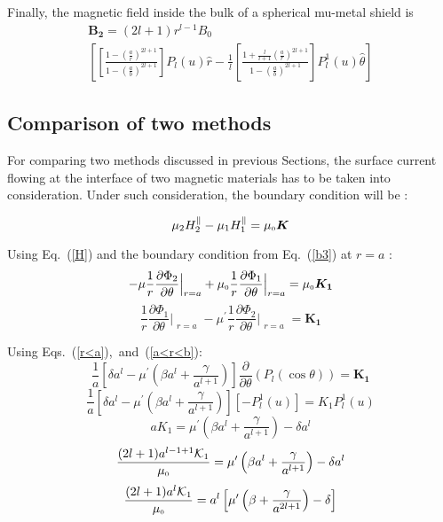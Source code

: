 Finally, the magnetic field inside the bulk of a spherical mu-metal shield is
\begin{multline}\label{B}
\bm{B_2}=(2l+1)r^{l-1} B_0  \\
\left[ \left[\frac{1-\left(\frac{a}{r}\right)^{2l+1}}{1-\left(\frac{a}{b}\right)^{2l+1}}\right]P_l(u) \hat{r} -\frac{1}{l}\left[\frac{1+\frac{l}{l+1}\left(\frac{a}{r}\right)^{2l+1}}{1-\left(\frac{a}{b}\right)^{2l+1}}\right] P_l^1(u)\hat{\theta} \right]
\end{multline}


\subsection{Comparison of two methods}
For comparing two methods discussed in previous Sections, the surface current flowing at the interface of two magnetic materials has to be taken into consideration. Under such consideration, the boundary condition will be :


\begin{equation}\label{b3}   
\mu_2 H_2^\parallel - \mu_1 H_1^\parallel =\mu_{\scriptscriptstyle 0} \bm{K}  
\end{equation}

Using Eq.~(\ref{H}) and the boundary condition from Eq.~(\ref{b3}) at $r=a$ :
$$-\mu\frac{1}{r}\frac{\partial \Phi_2}{\partial \theta}\Bigr|_{\substack{r=a}}+\mu_{\scriptscriptstyle 0} \frac{1}{r}\frac{\partial \Phi_1}{\partial \theta}\Bigr|_{\substack{r=a}}=\mu_{\scriptscriptstyle 0}\bm{K_1}  $$
$$\frac{1}{r}\frac{\partial \Phi_1}{\partial \theta}\Bigr|_{\substack{r=a}}-\mu^{\prime}\frac{1}{r}\frac{\partial \Phi_2}{\partial \theta}\Bigr|_{\substack{r=a}}=\bm{K_1}  $$

Using Eqs.~(\ref{r<a}),~and~(\ref{a<r<b}):
$$\frac{1}{a}\left[\delta a^l-\mu^{\prime}\left(\beta a^l+\frac{\gamma}{a^{l+1}}\right)\right]\frac{\partial}{\partial \theta}(P_l(\cos\theta))= \bm{K_1}$$
$$\frac{1}{a}\left[\delta a^l-\mu^{\prime} \left(\beta a^l+\frac{\gamma}{a^{l+1}}\right)\right][-P_l^1(u)]= K_1 P_l^1(u)$$
$$a K_1=\mu^{\prime}\left(\beta a^l+\frac{\gamma}{a^{l+1}}\right)-\delta a^l$$
$$\frac{(2l+1)a^{l-1+1}\mathcal{K}_1}{\mu_{\scriptscriptstyle 0}}=\mu^{\prime}\left(\beta a^l+\frac{\gamma}{a^{l+1}}\right)-\delta a^l$$
$$\frac{(2l+1)a^l\mathcal{K}_1}{\mu_{\scriptscriptstyle 0}}=a^l\left[\mu^{\prime}\left(\beta +\frac{\gamma}{a^{2l+1}}\right)-\delta \right]$$

